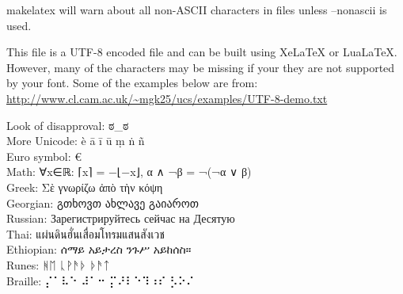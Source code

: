 \documentclass[letterpaper,12pt]{article}
\begin{document}
makelatex will warn about all non-ASCII characters in files unless --nonascii is used.

This file is a UTF-8 encoded file and can be built using XeLaTeX or LuaLaTeX. However, many of the characters may be missing if your they are not supported by your font. Some of the examples below are from: \url{http://www.cl.cam.ac.uk/~mgk25/ucs/examples/UTF-8-demo.txt}

Look of disapproval: ಠ\_ಠ\\
More Unicode: è ā ī ū ṃ ṅ ñ\\
Euro symbol: €\\
Math: ∀x∈ℝ: ⌈x⌉ = −⌊−x⌋, α ∧ ¬β = ¬(¬α ∨ β)\\
Greek: Σὲ γνωρίζω ἀπὸ τὴν κόψη\\
Georgian: გთხოვთ ახლავე გაიაროთ\\
Russian: Зарегистрируйтесь сейчас на Десятую\\
Thai: แผ่นดินฮั่นเสื่อมโทรมแสนสังเวช\\
Ethiopian: ሰማይ አይታረስ ንጉሥ አይከሰስ።\\
Runes: ᚻᛖ ᚳᚹᚫᚦ ᚦᚫᛏ\\
Braille: ⡌⠁⠧⠑ ⠼⠁⠒  ⡍⠜⠇⠑⠹⠰⠎ ⡣⠕⠌\\
\end{document}
